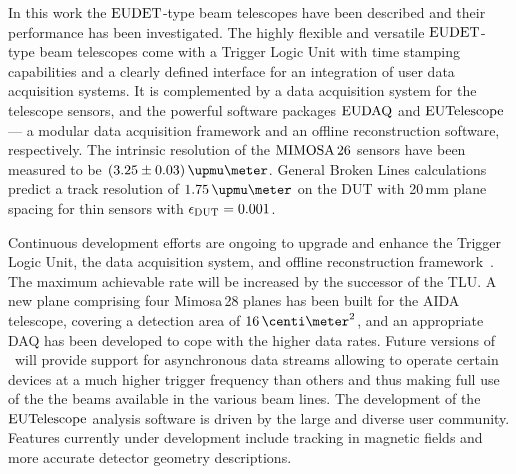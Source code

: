 

In this work the $\textrm{EUDET}$-type beam telescopes have been described and their performance has been investigated. 
The highly flexible and versatile $\textrm{EUDET}$-type beam telescopes come with a Trigger Logic Unit with time stamping capabilities and a clearly defined interface for an integration of user data acquisition systems.
It is complemented by a data acquisition system for the telescope sensors, and the powerful software packages $\textrm{EUDAQ}$ and $\textrm{EUTelescope}$
 ---  a modular data acquisition framework and an offline reconstruction software, respectively. 
The intrinsic resolution of the $\textrm{MIMOSA\,26}$ sensors have been measured to be $(3.25 \pm 0.03)\,\upmu\meter$.
General Broken Lines calculations predict a track resolution of $1.75\,\upmu\meter$ on the DUT with 20\,mm plane spacing for thin sensors with $\mathnormal{\epsilon_{\textrm{DUT}}} = 0.001$.

Continuous development efforts are ongoing to upgrade and enhance the Trigger Logic Unit, the data acquisition system, and offline reconstruction framework~\cite{ref:tipp2014_eudaq}.  
The maximum achievable rate will be increased by the successor of the TLU. 
A new plane comprising four Mimosa\,28 planes has been built for the AIDA telescope, covering a detection area of $16\,\centi\meter^2$, and an appropriate DAQ has been developed to cope with the higher data rates. 
Future versions of \eudaq\ will provide support for asynchronous data streams allowing to operate certain devices at a much higher trigger frequency than others
 and thus making full use of the the beams available in the various beam lines.
The development of the $\textrm{EUTelescope}$ analysis software is driven by the large and diverse user community. 
Features currently under development include tracking in magnetic fields and more accurate detector geometry descriptions. 
